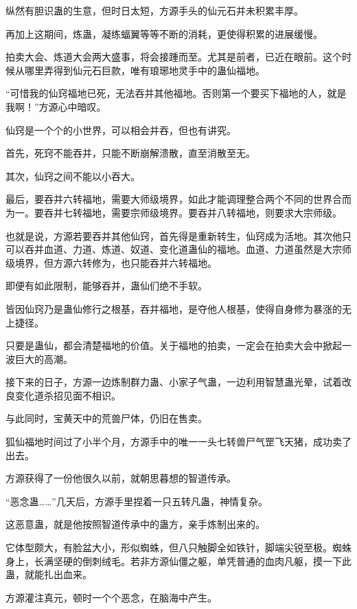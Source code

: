 
\begin{this_body}

纵然有胆识蛊的生意，但时日太短，方源手头的仙元石并未积累丰厚。

再加上这期间，炼蛊，凝练蝠翼等等不断的消耗，更使得积累的进展缓慢。

拍卖大会、炼道大会两大盛事，将会接踵而至。尤其是前者，已近在眼前。这个时候从哪里弄得到仙元石巨款，唯有琅琊地灵手中的蛊仙福地。

“可惜我的仙窍福地已死，无法吞并其他福地。否则第一个要买下福地的人，就是我啊！”方源心中暗叹。

仙窍是一个个的小世界，可以相会并吞，但也有讲究。

首先，死窍不能吞并，只能不断崩解溃散，直至消散至无。

其次，仙窍之间不能以小吞大。

最后，要吞并六转福地，需要大师级境界，如此才能调理整合两个不同的世界合而为一。要吞并七转福地，需要宗师级境界。要吞并八转福地，则要求大宗师级。

也就是说，方源若要吞并其他仙窍，首先得是重新转生，仙窍成为活地。其次他只可以吞并血道、力道、炼道、奴道、变化道蛊仙的福地。血道、力道虽然是大宗师级境界，但方源六转修为，也只能吞并六转福地。

即便有如此限制，能够吞并，蛊仙们绝不手软。

皆因仙窍乃是蛊仙修行之根基，吞并福地，是夺他人根基，使得自身修为暴涨的无上捷径。

只要是蛊仙，都会清楚福地的价值。关于福地的拍卖，一定会在拍卖大会中掀起一波巨大的高潮。

接下来的日子，方源一边炼制群力蛊、小家子气蛊，一边利用智慧蛊光晕，试着改良变化道杀招见面不相识。

与此同时，宝黄天中的荒兽尸体，仍旧在售卖。

狐仙福地时间过了小半个月，方源手中的唯一一头七转兽尸气罡飞天猪，成功卖了出去。

方源获得了一份他很久以前，就朝思暮想的智道传承。

“恶念蛊……”几天后，方源手里捏着一只五转凡蛊，神情复杂。

这恶意蛊，就是他按照智道传承中的蛊方，亲手炼制出来的。

它体型颇大，有脸盆大小，形似蜘蛛，但八只触脚全如铁针，脚端尖锐至极。蜘蛛身上，长满坚硬的倒刺绒毛。若非方源仙僵之躯，单凭普通的血肉凡躯，摸一下此蛊，就能扎出血来。

方源灌注真元，顿时一个个恶念，在脑海中产生。


\end{this_body}
